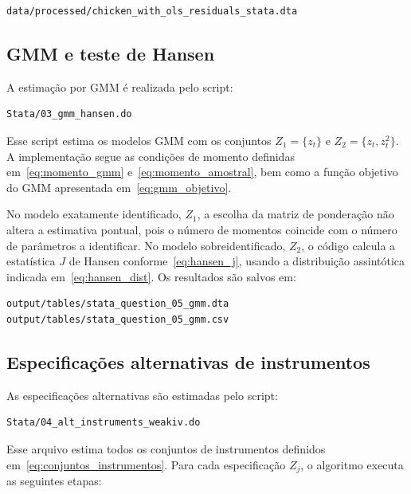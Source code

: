\documentclass[12pt,a4paper]{article}
\begin{document}
\begin{verbatim}
data/processed/chicken_with_ols_residuals_stata.dta
\end{verbatim}

\subsection*{GMM e teste de Hansen}

A estimação por GMM é realizada pelo script:

\begin{verbatim}
Stata/03_gmm_hansen.do
\end{verbatim}

Esse script estima os modelos GMM com os conjuntos \(Z_1=\{z_t\}\) e \(Z_2=\{z_t,z_t^2\}\). A implementação segue as condições de momento definidas em~\eqref{eq:momento_gmm} e~\eqref{eq:momento_amostral}, bem como a função objetivo do GMM apresentada em~\eqref{eq:gmm_objetivo}.

No modelo exatamente identificado, \(Z_1\), a escolha da matriz de ponderação não altera a estimativa pontual, pois o número de momentos coincide com o número de parâmetros a identificar. No modelo sobreidentificado, \(Z_2\), o código calcula a estatística \(J\) de Hansen conforme~\eqref{eq:hansen_j}, usando a distribuição assintótica indicada em~\eqref{eq:hansen_dist}. Os resultados são salvos em:

\begin{verbatim}
output/tables/stata_question_05_gmm.dta
output/tables/stata_question_05_gmm.csv
\end{verbatim}

\subsection*{Especificações alternativas de instrumentos}

As especificações alternativas são estimadas pelo script:

\begin{verbatim}
Stata/04_alt_instruments_weakiv.do
\end{verbatim}

Esse arquivo estima todos os conjuntos de instrumentos definidos em~\eqref{eq:conjuntos_instrumentos}. Para cada especificação \(Z_j\), o algoritmo executa as seguintes etapas:
\end{document}
